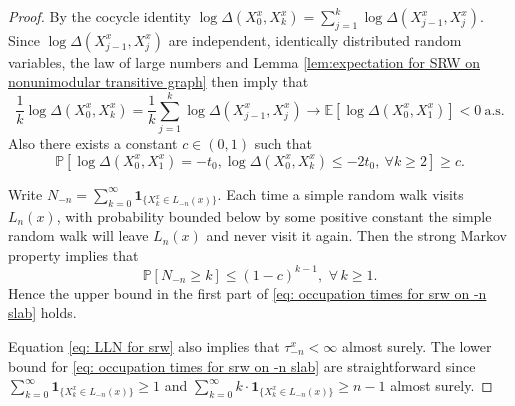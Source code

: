 \documentclass[12pt]{article}
\numberwithin{equation}{section}
\newcommand{\be}{\begin{equation}}
\newcommand{\ee}{\end{equation}}
\def\as {\mathrm{a.s.}}
\newcommand{\1}{\mathbf{1}}
\begin{document}
 \begin{proof}
 	By the cocycle identity $\log \Delta(X_0^x,X_k^x)=\sum_{j=1}^{k}\log \Delta(X_{j-1}^x,X_j^x)$. 
 	Since $\log \Delta(X_{j-1}^x,X_j^x)$ are independent, identically distributed random variables, the law of large numbers and Lemma \ref{lem:expectation for SRW on nonunimodular transitive graph}  then imply that 
 	\be\label{eq: LLN for srw}
 	\frac{1}{k}\log \Delta(X_0^x,X_k^x)=\frac{1}{k}\sum_{j=1}^{k}\log \Delta(X_{j-1}^x,X_j^x)\rightarrow
 	\mathbb{E}[\log\Delta(X_0^x,X_1^x)]<0\ \as
 	\ee
 	Also there exists a constant $c\in(0,1)$ such that 
 	\be \label{eq: positive probability for a cutpoint}
 	\mathbb{P}[\log\Delta(X_0^x,X_1^x)=-t_0,\log\Delta(X_0^x,X_k^x)\leq -2t_0,\ \forall k\geq 2]\geq c.
 	\ee
 	
 	Write $N_{-n}=\sum_{k=0}^{\infty}\mathbf{1}_{\{X_k^x\in L_{-n}(x) \}}$.  Each time a simple random walk visits $L_n(x)$, with probability bounded below by some positive constant the simple random walk will leave $L_n(x)$ and never visit it again. Then the strong Markov property implies that 
 	\be\label{eq: strong Markov property for SRW}
 	\mathbb{P}[N_{-n}\geq k]\leq (1-c)^{k-1},\,\,\forall \, k\geq1.
 	\ee
 	Hence the upper bound in the  first part of \eqref{eq: occupation times for srw on -n slab} holds.
 	
 	
 	Equation \eqref{eq: LLN for srw} also implies that $\tau_{-n}^x<\infty$ almost surely. The lower bound for \eqref{eq: occupation times for srw on -n slab} are straightforward since $\sum_{k=0}^{\infty}\mathbf{1}_{\{X_k^x\in L_{-n}(x) \}}\geq 1$ and $\sum_{k=0}^{\infty}k\cdot \mathbf{1}_{\{X_k^x\in L_{-n}(x) \}}\geq n-1$ almost surely. 
 	
 	
 	

\end{proof}
\end{document}
